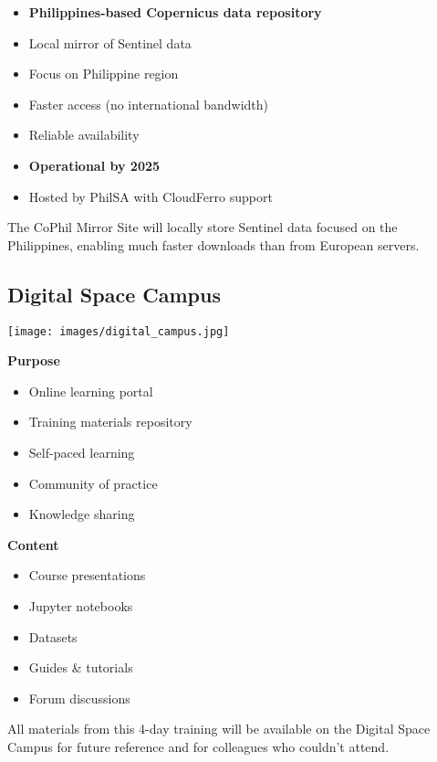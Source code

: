 \documentclass[
  letterpaper,
  DIV=11,
  numbers=noendperiod]{scrartcl}
\providecommand{\tightlist}{%
  \setlength{\itemsep}{0pt}\setlength{\parskip}{0pt}}
\begin{document}
\begin{itemize}
\tightlist
\item
  \textbf{Philippines-based Copernicus data repository}
\item
  Local mirror of Sentinel data
\item
  Focus on Philippine region
\item
  Faster access (no international bandwidth)
\item
  Reliable availability
\item
  \textbf{Operational by 2025}
\item
  Hosted by PhilSA with CloudFerro support
\end{itemize}

The CoPhil Mirror Site will locally store Sentinel data focused on the
Philippines, enabling much faster downloads than from European servers.

\subsection{Digital Space Campus}\label{digital-space-campus}

\begin{center}
\texttt{[image: images/digital\_campus.jpg]}
\end{center}

\textbf{Purpose}

\begin{itemize}
\tightlist
\item
  Online learning portal
\item
  Training materials repository
\item
  Self-paced learning
\item
  Community of practice
\item
  Knowledge sharing
\end{itemize}

\textbf{Content}

\begin{itemize}
\tightlist
\item
  Course presentations
\item
  Jupyter notebooks
\item
  Datasets
\item
  Guides \& tutorials
\item
  Forum discussions
\end{itemize}

All materials from this 4-day training will be available on the Digital
Space Campus for future reference and for colleagues who couldn't
attend.
\end{document}

